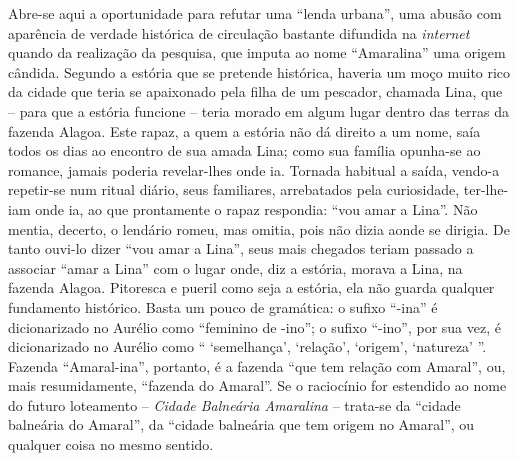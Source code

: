 Abre-se aqui a oportunidade para refutar uma ``lenda urbana'', uma abusão com aparência de verdade histórica de circulação bastante difundida na \textit{internet} quando da realização da pesquisa, que imputa ao nome ``Amaralina'' uma origem cândida. Segundo a estória que se pretende histórica, haveria um moço muito rico da cidade que teria se apaixonado pela filha de um pescador, chamada Lina, que -- para que a estória funcione -- teria morado em algum lugar dentro das terras da fazenda Alagoa. Este rapaz, a quem a estória não dá direito a um nome, saía todos os dias ao encontro de sua amada Lina; como sua família opunha-se ao romance, jamais poderia revelar-lhes onde ia. Tornada habitual a saída, vendo-a repetir-se num ritual diário, seus familiares, arrebatados pela curiosidade, ter-lhe-iam onde ia, ao que prontamente o rapaz respondia: ``vou amar a Lina''. Não mentia, decerto, o lendário romeu, mas omitia, pois não dizia aonde se dirigia. De tanto ouvi-lo dizer ``vou amar a Lina'', seus mais chegados teriam passado a associar ``amar a Lina'' com o lugar onde, diz a estória, morava a Lina, na fazenda Alagoa. Pitoresca e pueril como seja a estória, ela não guarda qualquer fundamento histórico. Basta um pouco de gramática: o sufixo ``-ina'' é dicionarizado no Aurélio como ``feminino de -ino''; o sufixo ``-ino'', por sua vez, é dicionarizado no Aurélio como `` `semelhança', `relação', `origem', `natureza' ''. Fazenda ``Amaral-ina'', portanto, é a fazenda ``que tem relação com Amaral'', ou, mais resumidamente, ``fazenda do Amaral''. Se o raciocínio for estendido ao nome do futuro loteamento -- \textit{Cidade Balneária Amaralina} -- trata-se da ``cidade balneária do Amaral'', da ``cidade balneária que tem origem no Amaral'', ou qualquer coisa no mesmo sentido.

